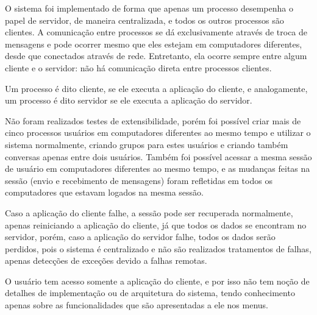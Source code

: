 \documentclass[../main.tex]{subfiles}
\begin{document}
O sistema foi implementado de forma que apenas um processo desempenha o papel de servidor, de maneira centralizada, e todos os outros processos são clientes.
A comunicação entre processos se dá exclusivamente através de troca de mensagens e pode ocorrer mesmo que eles estejam em computadores diferentes, desde que conectados através de rede.
Entretanto, ela ocorre sempre entre algum cliente e o servidor: não há comunicação direta entre processos clientes.

Um processo é dito cliente, se ele executa a aplicação do cliente, e analogamente, um processo é dito servidor se ele executa a aplicação do servidor.

Não foram realizados testes de extensibilidade, porém foi possível criar mais de cinco processos usuários em computadores diferentes ao mesmo tempo e utilizar o sistema normalmente, criando grupos para estes usuários e criando também conversas apenas entre dois usuários. Também foi possível acessar a mesma sessão de usuário em computadores diferentes ao mesmo tempo, e as mudanças feitas na sessão (envio e recebimento de mensagens) foram refletidas em todos os computadores que estavam logados na mesma sessão.

Caso a aplicação do cliente falhe, a sessão pode ser recuperada normalmente, apenas reiniciando a aplicação do cliente, já que todos os dados se encontram no servidor, porém, caso a aplicação do servidor falhe, todos os dados serão perdidos, pois o sistema é centralizado e não são realizados tratamentos de falhas, apenas detecções de exceções devido a falhas remotas.

O usuário tem acesso somente a aplicação do cliente, e por isso não tem noção de detalhes de implementação ou de arquitetura do sistema, tendo conhecimento apenas sobre as funcionalidades que são apresentadas a ele nos menus.
\end{document}
